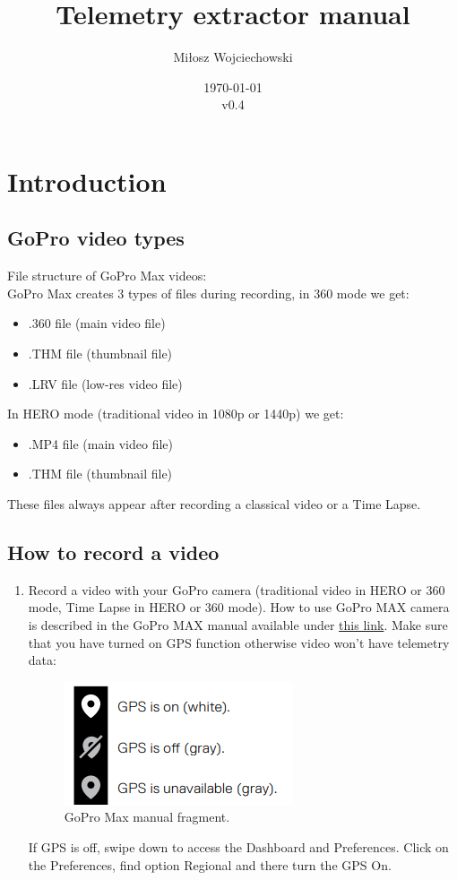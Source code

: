 \documentclass[a4paper,12pt]{book}
\begin{document}
\author{Miłosz Wojciechowski}
\title{Telemetry extractor manual}
\date{\today\\ v0.4}


\maketitle
\pagebreak
{}
\renewcommand{\labelenumii}{\arabic{enumi}.\arabic{enumii}}
\tableofcontents
\chapter{Introduction}
\section{GoPro video types}
File structure of GoPro Max videos:\\	
GoPro Max creates 3 types of files during recording, in 360 mode we get:
	\begin{itemize}
		\item .360 file (main video file)
		\item .THM file (thumbnail file)
		\item .LRV file (low-res video file)\\
	\end{itemize}
	In HERO mode (traditional video in 1080p or 1440p) we get:
	\begin{itemize}
		\item .MP4 file (main video file)
		\item .THM file (thumbnail file)\\
	\end{itemize}
	These files always appear after recording a classical video or a Time Lapse.\\
	
\section{How to record a video}
\begin{enumerate}
	\item Record a video with your GoPro camera (traditional video in HERO or 360 mode, Time Lapse in HERO or 360 mode). How to use GoPro MAX camera is described in the GoPro MAX manual available under \href{https://gopro.com/content/dam/help/max/manuals/MAX_UM_ENG_REVB.pdf}{this link}. Make sure that you have turned on GPS function otherwise video won't have telemetry data:
	\begin{figure}[H]
		\centering
		\includegraphics{GoPro_manual_fragment}
		\caption{GoPro Max manual fragment.}
	\end{figure}
	If GPS is off, swipe down to access the Dashboard and Preferences. Click on the Preferences, find option Regional and there turn the GPS On.\\
\end{enumerate}
\end{document}
